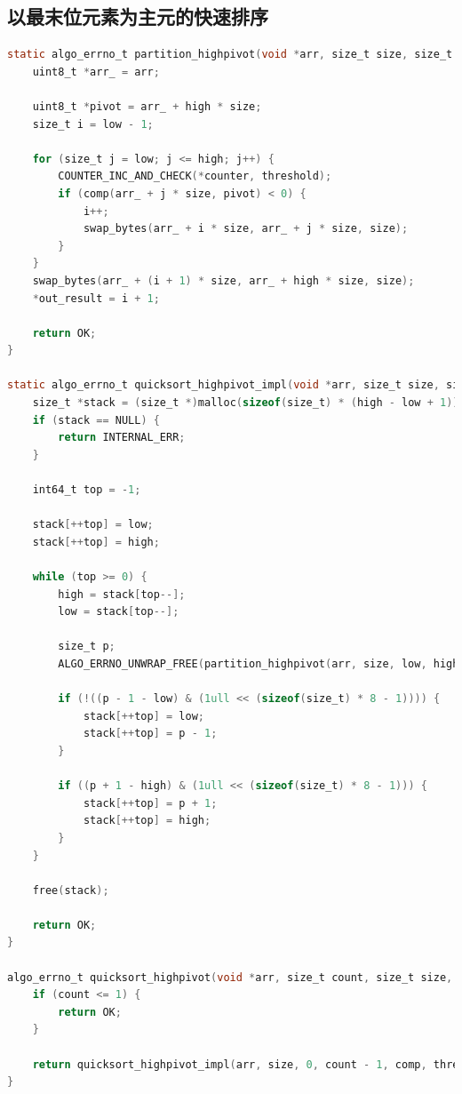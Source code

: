 \documentclass[12pt]{article}
\begin{document}
\subsection{以最末位元素为主元的快速排序}

\begin{lstlisting}[language=C]
static algo_errno_t partition_highpivot(void *arr, size_t size, size_t low, size_t high, comp_t comp, uint64_t threshold, uint64_t *counter, size_t *out_result) {
    uint8_t *arr_ = arr;

    uint8_t *pivot = arr_ + high * size;
    size_t i = low - 1;

    for (size_t j = low; j <= high; j++) {
        COUNTER_INC_AND_CHECK(*counter, threshold);
        if (comp(arr_ + j * size, pivot) < 0) {
            i++;
            swap_bytes(arr_ + i * size, arr_ + j * size, size);
        }
    }
    swap_bytes(arr_ + (i + 1) * size, arr_ + high * size, size);
    *out_result = i + 1;

    return OK;
}

static algo_errno_t quicksort_highpivot_impl(void *arr, size_t size, size_t low, size_t high, comp_t comp, uint64_t threshold, uint64_t *counter) {
    size_t *stack = (size_t *)malloc(sizeof(size_t) * (high - low + 1));
    if (stack == NULL) {
        return INTERNAL_ERR;
    }

    int64_t top = -1;

    stack[++top] = low;
    stack[++top] = high;

    while (top >= 0) {
        high = stack[top--];
        low = stack[top--];

        size_t p;
        ALGO_ERRNO_UNWRAP_FREE(partition_highpivot(arr, size, low, high, comp, threshold, counter, &p), stack);

        if (!((p - 1 - low) & (1ull << (sizeof(size_t) * 8 - 1)))) {
            stack[++top] = low;
            stack[++top] = p - 1;
        }

        if ((p + 1 - high) & (1ull << (sizeof(size_t) * 8 - 1))) {
            stack[++top] = p + 1;
            stack[++top] = high;
        }
    }

    free(stack);

    return OK;
}

algo_errno_t quicksort_highpivot(void *arr, size_t count, size_t size, comp_t comp, uint64_t threshold, uint64_t *out_counter) {
    if (count <= 1) {
        return OK;
    }

    return quicksort_highpivot_impl(arr, size, 0, count - 1, comp, threshold, out_counter);
}
\end{lstlisting}
\end{document}

